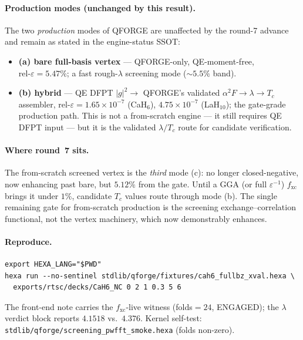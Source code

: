 \documentclass[11pt,a4paper]{article}
\begin{document}
\paragraph{Production modes (unchanged by this result).} The two
\emph{production} modes of QFORGE are unaffected by the round-7 advance and
remain as stated in the engine-status SSOT:
\begin{itemize}
\item \textbf{(a) bare full-basis vertex} --- QFORGE-only, QE-moment-free,
$\mathrm{rel}\text{-}\varepsilon = 5.47\%$; a fast rough-$\lambda$ screening
mode ($\sim\!5.5\%$ band).
\item \textbf{(b) hybrid} --- QE DFPT $|g|^2 \to$ QFORGE's validated
$\alpha^2F \to \lambda \to T_c$ assembler,
$\mathrm{rel}\text{-}\varepsilon = 1.65\times10^{-7}$ (CaH$_6$),
$4.75\times10^{-7}$ (LaH$_{10}$); the gate-grade production path. This is not
a from-scratch engine --- it still requires QE DFPT input --- but it is the
validated $\lambda/T_c$ route for candidate verification.
\end{itemize}

\paragraph{Where round~7 sits.} The from-scratch screened vertex is the
\emph{third} mode (c): no longer closed-negative, now enhancing past bare, but
$5.12\%$ from the gate. Until a GGA (or full $\varepsilon^{-1}$) $f_{\mathrm{xc}}$
brings it under $1\%$, candidate $T_c$ values route through mode (b). The
single remaining gate for from-scratch production is the screening
exchange--correlation functional, not the vertex machinery, which now
demonstrably enhances.

\paragraph{Reproduce.}
\begin{lstlisting}[basicstyle=\ttfamily\small,frame=single,breaklines=true]
export HEXA_LANG="$PWD"
hexa run --no-sentinel stdlib/qforge/fixtures/cah6_fullbz_xval.hexa \
  exports/rtsc/decks/CaH6_NC 0 2 1 0.3 5 6
\end{lstlisting}
The front-end note carries the $f_{\mathrm{xc}}$-live witness (folds$=24$,
ENGAGED); the $\lambda$ verdict block reports $4.1518$ vs.\ $4.376$. Kernel
self-test: \texttt{stdlib/qforge/screening\_pwfft\_smoke.hexa} (folds non-zero).

\end{document}
